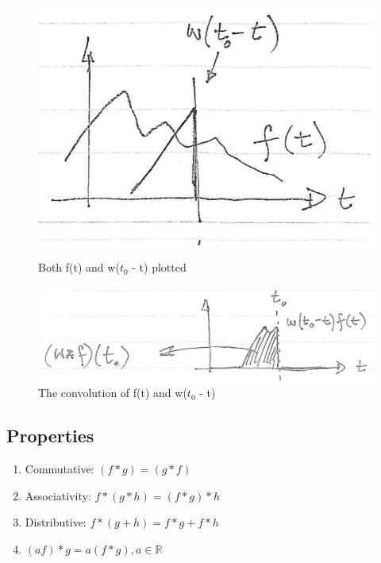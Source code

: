\documentclass[11pt]{article}
\begin{document}
    \begin{figure}
        \begin{minipage}[t]{.49\textwidth}    
        \centering
        \includegraphics[width=\textwidth]{figures/lecture03/wt.png}
            \caption{Both f(t) and w($t_0$ - t) plotted}
        \label{fig:f(t) and w($t_0$ - t)}
        \end{minipage}\hfill
        \begin{minipage}[t]{.49\textwidth}    
        \centering
        \includegraphics[width=\textwidth]{figures/lecture03/tconvw.png}
        \caption{The convolution of f(t) and w($t_0$ - t)}
        \label{fig:convolution of f(t) and w($t_0$ - t)}
        \end{minipage}
    \end{figure}

\subsection{Properties}
    \begin{enumerate}
        \item Commutative: $(f*g) = (g*f)$ 
        \item Associativity: $f*(g*h) = (f*g)*h$ 
        \item Distributive: $f*(g+h) = f*g+f*h$ 
        \item $(af)*g = a(f*g), a \in \mathbb{R}$
    \end{enumerate}
	
\end{document}
